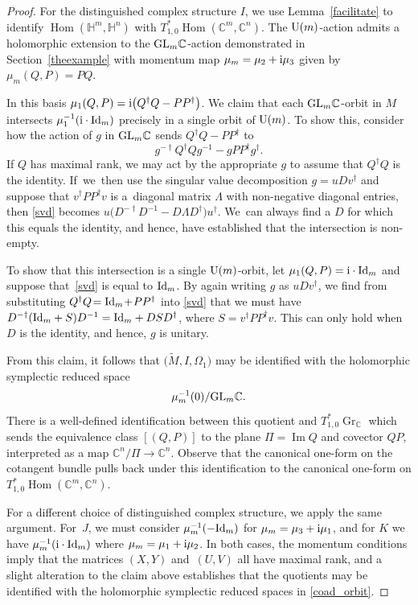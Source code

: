 \documentclass[pdftex]{sigma}
\numberwithin{equation}{section}
\DeclareMathOperator{\Imag}{Im}
\DeclareMathOperator{\Hom}{Hom}
\DeclareMathOperator{\Gr}{Gr}
\newcommand{\C}{\mathbb{C}}
\newcommand{\Q}{\mathbb{H}}
\newcommand{\Id}{{\rm Id}}
\begin{document}
\begin{proof}
	For the distinguished complex structure $I$, we use Lemma~\ref{facilitate} to identify $\Hom(\Q^m,\Q^n)$ with ${T^*_{1,0}\Hom(\C^m,\C^n)}$. The ${\rm U}(m)$-action admits a holomorphic extension to the ${\rm GL}_m\C$-action demonstrated in Section~\ref{theexample} with momentum map $\mu_m=\mu_2+{\rm i}\mu_3$ given by $\mu_m(Q,P)=PQ$.
	
	In this basis $\mu_1(Q,P)={\rm i}\bigl(Q^\dagger Q-PP^\dagger\bigr)$. We claim that each ${\rm GL}_m\C$-orbit in $M$ intersects $\mu_1^{-1}({\rm i}\cdot\Id_m)$ precisely in a single orbit of ${\rm U}(m)$. To show this, consider how the action of $g$ in ${\rm GL}_m\C$ sends $Q^\dagger Q-PP^\dagger$ to
	\begin{equation}\label{svd}
		g^{-\dagger}Q^\dagger Qg^{-1}-gPP^\dagger g^{\dagger}.
	\end{equation}
	If $Q$ has maximal rank, we may act by the appropriate $g$ to assume that $Q^\dagger Q$ is the identity. If~we~then use the singular value decomposition $g=uDv^\dagger$ and suppose that $v^\dagger PP^\dagger v$ is a~diagonal matrix $\Lambda$ with non-negative diagonal entries, then \eqref{svd} becomes $u\bigl(D^{-\dagger}D^{-1}-D\Lambda D^\dagger\bigr)u^\dagger$. We~can always find a $D$ for which this equals the identity, and hence, have established that the intersection is non-empty.
	
	To show that this intersection is a single ${\rm U}(m)$-orbit, let $\mu_1(Q,P)={\rm i}\cdot\Id_m$ and suppose that~\eqref{svd} is equal to $\Id_m$. By again writing $g$ as $uDv^\dagger$, we find from substituting ${Q^\dagger Q\!=\Id_m\!+\!PP^\dagger}$ into \eqref{svd} that we must have $D^{-\dagger}(\Id_m+S)D^{-1}=\Id_m+DSD^\dagger$, where $S=v^\dagger PP^\dagger v$. This can only hold when $D$ is the identity, and hence, $g$ is unitary.
	
	From this claim, it follows that $\bigl(\tilde{M},I,\Omega_1\bigr)$ may be identified with the holomorphic symplectic reduced space
	\begin{equation*}%
		\mu_m^{-1}(0)/{\rm GL}_m\C.
	\end{equation*}
	There is a well-defined identification between this quotient and $T^*_{1,0}\Gr_\C$ which sends the equivalence class $[(Q,P)]$ to the plane $\Pi=\Imag Q$ and covector $QP$, interpreted as a map $\C^n/\Pi\rightarrow\C^n$. Observe that the canonical one-form on the cotangent bundle pulls back under this identification to the canonical one-form on $T^*_{1,0}\Hom(\C^m,\C^n)$.
	
	For a different choice of distinguished complex structure, we apply the same argument. For~$J$, we must consider $\mu_m^{-1}(-\Id_m)$ for $\mu_m=\mu_3+{\rm i}\mu_1$, and for $K$ we have $\mu_m^{-1}({\rm i}\cdot\Id_m)$ where ${\mu_m=\mu_1+{\rm i}\mu_2}$. In both cases, the momentum conditions imply that the matrices $(X,Y)$ and~$(U,V)$ all have maximal rank, and a slight alteration to the claim above establishes that the quotients may be identified with the holomorphic symplectic reduced spaces in \eqref{coad_orbit}.
\end{proof}
\end{document}
